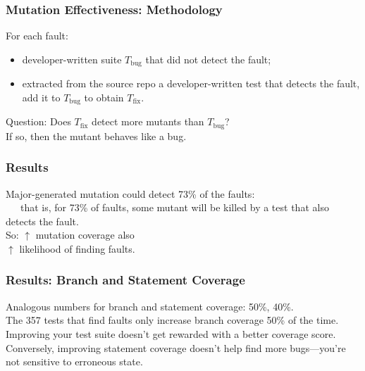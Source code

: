 \documentclass{beamer}
\newenvironment{changemargin}[1]{%
  \begin{list}{}{%
    \setlength{\topsep}{0pt}%
    \setlength{\leftmargin}{#1}%
    \setlength{\rightmargin}{1em}
    \setlength{\listparindent}{\parindent}%
    \setlength{\itemindent}{\parindent}%
    \setlength{\parsep}{\parskip}%
  }%
  \item[]}{\end{list}}
\begin{document}
\begin{frame}[fragile]
  \frametitle{Mutation Effectiveness: Methodology}
  \begin{changemargin}{2em}
    For each fault:
    \begin{itemize}
    \item developer-written suite $T_{\mbox{bug}}$ that did not detect the fault;
    \item extracted from the source repo a developer-written test that detects the fault, add it to $T_{\mbox{bug}}$  to obtain $T_{\mbox{fix}}$.
    \end{itemize}
    Question: Does $T_{\mbox{fix}}$ detect more mutants than $T_{\mbox{bug}}$?\\
    If so, then the mutant behaves like a bug.

  \end{changemargin}
\end{frame}

\begin{frame}
  \frametitle{Results}
  \Large
  \begin{changemargin}{2em}
    Major-generated mutation could detect 73\% of the faults:\\
    ~~~that is, for 73\% of faults, some mutant will be killed by a test that also detects the fault.\\[1em]
    So: $\uparrow$ mutation coverage  also \\
    \hspace*{3em}$\uparrow$ likelihood of finding faults.\\[2em]
    
  \end{changemargin}
\end{frame}

\begin{frame}
  \frametitle{Results: Branch and Statement Coverage}
  \Large
  \begin{changemargin}{2em}
    Analogous numbers for branch and statement coverage: 50\%, 40\%.\\[1em]
    The 357 tests that find faults only increase branch coverage 50\% of the time.\\[1em]
    Improving your test suite doesn't get rewarded with a better coverage score.\\[1em]
    Conversely, improving statement coverage doesn't help find more bugs---you're not sensitive to erroneous state.
  \end{changemargin}
\end{frame}
\end{document}
